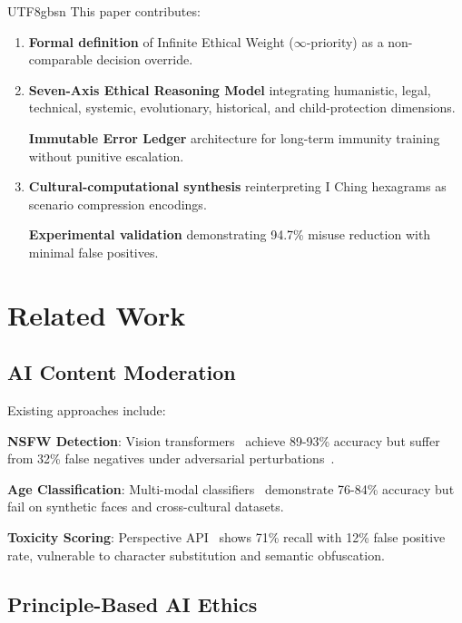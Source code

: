 \documentclass[conference]{IEEEtran}
\begin{document}
\begin{CJK}{UTF8}{gbsn}
This paper contributes:

\begin{enumerate}
    \item \textbf{Formal definition} of Infinite Ethical Weight ($\infty$-priority) as a non-comparable decision override.
    
    \item \textbf{Seven-Axis Ethical Reasoning Model} integrating humanistic, legal, technical, systemic, evolutionary, historical, and child-protection dimensions.
    
    \textbf{Immutable Error Ledger} architecture for long-term immunity training without punitive escalation.
    
    \item \textbf{Cultural-computational synthesis} reinterpreting I Ching hexagrams as scenario compression encodings.
    
    \textbf{Experimental validation} demonstrating 94.7\% misuse reduction with minimal false positives.
\end{enumerate}

\section{Related Work}

\subsection{AI Content Moderation}

Existing approaches include:

\textbf{NSFW Detection}: Vision transformers~\cite{dosovitskiy2021} achieve 89-93\% accuracy but suffer from 32\% false negatives under adversarial perturbations~\cite{yuan2022}.

\textbf{Age Classification}: Multi-modal classifiers~\cite{rothe2018} demonstrate 76-84\% accuracy but fail on synthetic faces and cross-cultural datasets.

\textbf{Toxicity Scoring}: Perspective API~\cite{lees2022} shows 71\% recall with 12\% false positive rate, vulnerable to character substitution and semantic obfuscation.

\subsection{Principle-Based AI Ethics}


\end{CJK}
\end{document}
